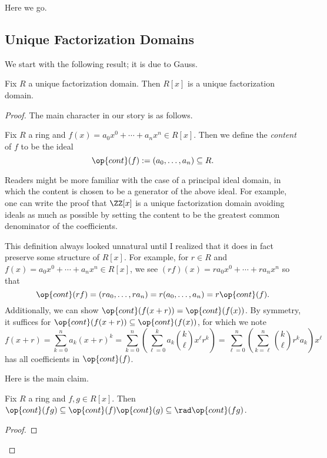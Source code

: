
Here we go.

\subsection{Unique Factorization Domains}

We start with the following result; it is due to Gauss.
\begin{theorem} \label{thm:rxisufd}
	Fix $R$ a unique factorization domain. Then $R[x]$ is a unique factorization domain.
\end{theorem}
\begin{proof}
	The main character in our story is as follows.
	\begin{definition}[Content]
		Fix $R$ a ring and $f(x)=a_0x^0+\cdots+a_nx^n\in R[x]$. Then we define the \textit{content} of $f$ to be the ideal
		\[\op{cont}(f):=(a_0,\ldots,a_n)\subseteq R.\]
	\end{definition}
	\begin{remark}[Nir]
		Readers might be more familiar with the case of a principal ideal domain, in which the content is chosen to be a generator of the above ideal. For example, one can write the proof that $\ZZ[x]$ is a unique factorization domain avoiding ideals as much as possible by setting the content to be the greatest common denominator of the coefficients.
	\end{remark}
	\begin{remark}[Nir]
		This definition always looked unnatural until I realized that it does in fact preserve some structure of $R[x]$. For example, for $r\in R$ and $f(x)=a_0x^0+\cdots+a_nx^n\in R[x]$, we see $(rf)(x)=ra_0x^0+\cdots+ra_nx^n$ so that
		\[\op{cont}(rf)=(ra_0,\ldots,ra_n)=r(a_0,\ldots,a_n)=r\op{cont}(f).\]
		Additionally, we can show $\op{cont}(f(x+r))=\op{cont}(f(x))$. By symmetry, it suffices for $\op{cont}(f(x+r))\subseteq\op{cont}(f(x))$, for which we note
		\[f(x+r)=\sum_{k=0}^na_k(x+r)^k=\sum_{k=0}^n\left(\sum_{\ell=0}^ka_k\binom k\ell x^\ell r^k\right)=\sum_{\ell=0}^n\left(\sum_{k=\ell}^n\binom k\ell r^ka_k\right)x^\ell\]
		has all coefficients in $\op{cont}(f)$.
	\end{remark}
	Here is the main claim.
	\begin{lemma}[Gauss] \label{lem:gauss}
		Fix $R$ a ring and $f,g\in R[x]$. Then $\op{cont}(fg)\subseteq\op{cont}(f)\op{cont}(g)\subseteq\rad\op{cont}(fg)$.
	\end{lemma}
	\begin{proof}

\end{proof}
\end{proof}
